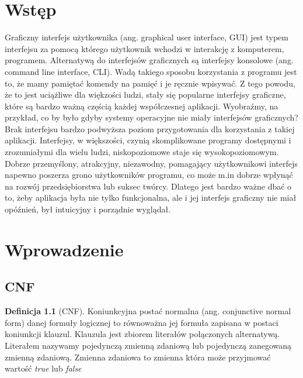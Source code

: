 \documentclass[a4paper,12pt,oneside]{book}
\theoremstyle{definition}
\newtheorem{definition}{Definicja}
\begin{document}


\tableofcontents{}

\chapter*{Wstęp}

 Graficzny interfejs użytkownika (ang. graphical user interface, GUI) jest typem interfejsu za pomocą którego użytkownik wchodzi w interakcję z komputerem, programem. Alternatywą do interfejsów graficznych są interfejsy konsolowe (ang. command line interface, CLI). Wadą takiego sposobu korzystania z programu jest to, że mamy pamiętać komendy na pamięć i je ręcznie wpisywać. Z tego powodu, że to jest uciążliwe dla więkzości ludzi, stały się popularne interfejsy graficzne, które są bardzo ważną częścią każdej współczesnej aplikacji. Wyobraźmy, na przykład, co by było gdyby systemy operacyjne nie miały interfejsów graficznych? Brak interfejsu bardzo podwyższa poziom przygotowania dla korzystania z takiej aplikacji. Interfejsy, w większości, czynią skomplikowane programy dostępnymi i zrozumiałymi dla wielu ludzi, niskopoziomowe staje się wysokopoziomowym. Dobrze przemyślony, atrakcyjny, niezawodny, pomagający użytkownikowi interfejs napewno poszerza grono użytkowników programu, co może m.in dobrze wpłynąć na rozwój przedsiębiorstwa lub suksec twórcy. Dlatego jest bardzo ważne dbać o to, żeby aplikacja była nie tylko funkcjonalna, ale i jej interfejs graficzny nie miał opóźnień, był intuicyjny i porządnie wyglądał. 

\chapter{Wprowadzenie}

\section{CNF}

\begin{definition}[CNF]
     Koniunkcyjna postać normalna (ang. conjunctive normal form) danej formuły logicznej to równoważna jej formuła zapisana w postaci koniunkcji klauzul. Klauzula jest zbiorem literałów połączonych alternatywą. Literałem nazywamy pojedynczą zmienną zdaniową lub pojedynczą zanegowaną zmienną zdaniową. Zmienna zdaniowa to zmienna która może przyjmować wartość \textit{true} lub \textit{false} 
\end{definition}
\end{document}

